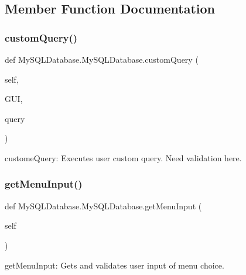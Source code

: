 \subsection{Member Function Documentation}
\hypertarget{class_my_s_q_l_database_1_1_my_s_q_l_database_a746a62e1c7d7b11e7f00bbcbd92ed860}{}\label{class_my_s_q_l_database_1_1_my_s_q_l_database_a746a62e1c7d7b11e7f00bbcbd92ed860} 
\subsubsection{\texorpdfstring{custom\+Query()}{customQuery()}}
{\footnotesize\ttfamily def My\+S\+Q\+L\+Database.\+My\+S\+Q\+L\+Database.\+custom\+Query (\begin{DoxyParamCaption}\item[{}]{self,  }\item[{}]{G\+UI,  }\item[{}]{query }\end{DoxyParamCaption})}

\begin{DoxyVerb}customeQuery: Executes user custom query. Need validation here. \end{DoxyVerb}
 \hypertarget{class_my_s_q_l_database_1_1_my_s_q_l_database_a01cc9f1c3e782ada4c437682ae31c14c}{}\label{class_my_s_q_l_database_1_1_my_s_q_l_database_a01cc9f1c3e782ada4c437682ae31c14c} 
\subsubsection{\texorpdfstring{get\+Menu\+Input()}{getMenuInput()}}
{\footnotesize\ttfamily def My\+S\+Q\+L\+Database.\+My\+S\+Q\+L\+Database.\+get\+Menu\+Input (\begin{DoxyParamCaption}\item[{}]{self }\end{DoxyParamCaption})}

\begin{DoxyVerb}getMenuInput: Gets and validates user input of menu choice. \end{DoxyVerb}
 \hypertarget{class_my_s_q_l_database_1_1_my_s_q_l_database_ac9c6bc35283d4bfeacf4394937c625de}{}\label{class_my_s_q_l_database_1_1_my_s_q_l_database_ac9c6bc35283d4bfeacf4394937c625de} 
